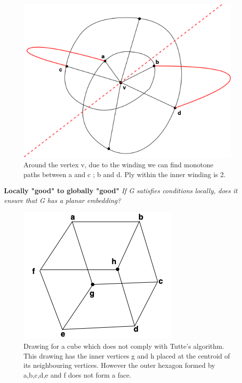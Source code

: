 \documentclass{article}
\begin{document}
\begin{itemize}
        \begin{figure}[H]
        \centering
        \includegraphics[scale=0.5]{Images/winding_around_a_vertex.png}
        \caption{Around the vertex v, due to the winding we can find monotone paths between a and c ; b and d. Ply within the inner winding is 2. }
        \label{fig:my_label}
        \end{figure}
    \end{itemize} 
    

    
    \medskip \noindent \textbf {Locally "good" to globally "good"}
    \textit{If G satisfies conditions locally, does it ensure that G has a planar embedding?}

        \begin{figure}[H]
        \centering
        \includegraphics[scale=0.5]{Images/cube.png}
        \caption{Drawing for a cube which does not comply with Tutte's algorithm. This drawing has the inner vertices g and h placed at the centroid of its neighbouring vertices. However the outer hexagon formed by a,b,c,d,e and f does not form a face.}
        \label{fig:my_label}
        \end{figure}
\end{document}
